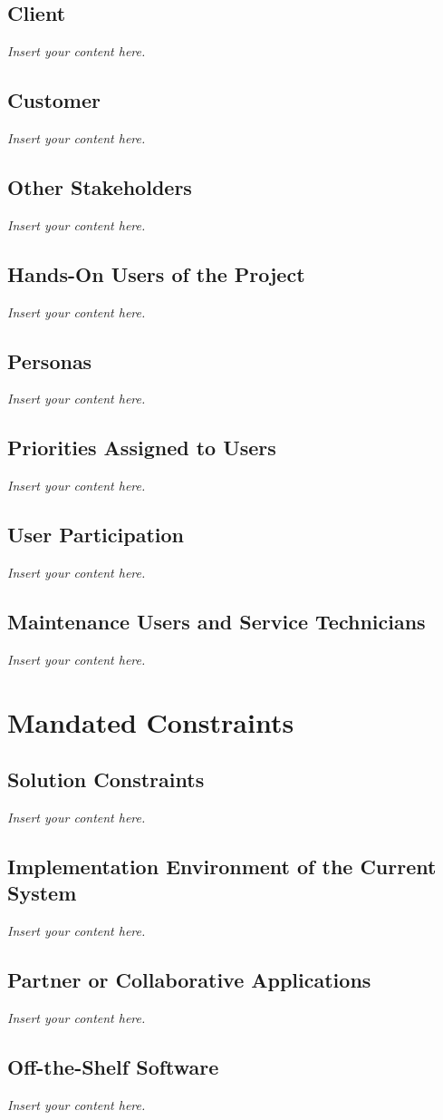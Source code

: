 \documentclass[12pt]{article}
\newcommand{\lips}{\textit{Insert your content here.}}
\begin{document}
\subsection{Client}
\lips
\subsection{Customer}
\lips
\subsection{Other Stakeholders}
\lips
\subsection{Hands-On Users of the Project}
\lips
\subsection{Personas}
\lips
\subsection{Priorities Assigned to Users}
\lips
\subsection{User Participation}
\lips
\subsection{Maintenance Users and Service Technicians}
\lips

\section{Mandated Constraints}
\subsection{Solution Constraints}
\lips
\subsection{Implementation Environment of the Current System}
\lips
\subsection{Partner or Collaborative Applications}
\lips
\subsection{Off-the-Shelf Software}
\lips
\end{document}
